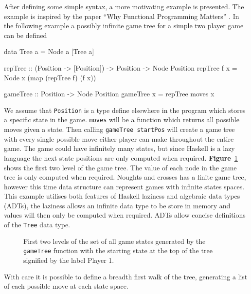 \documentclass[float=false, crop=false]{standalone}
\newcommand{\namefig}{\textbf{Figure}~}
\begin{document}
After defining some simple syntax, a more motivating example is presented. The example is 
inspired by the paper ``Why Functional Programming Matters''
\cite[]{whyfpm}. 
In the following example a possibly infinite game tree for a simple
two player game can be defined 
\begin{HaskellLst}
data Tree a = Node a [Tree a]

repTree :: (Position -> [Position]) -> Position -> Node Position
repTree f x = Node x (map (repTree f) (f x))

gameTree :: Position -> Node Position
gameTree x = repTree moves x
\end{HaskellLst}
We assume that \verb|Position| is a type define elsewhere in the program 
which stores a specific state in the game. 
\verb|moves| will be a function which returns all possible moves given a state.
Then calling \verb|gameTree startPos| will create
a game tree with every single possible move either player can make throughout
the entire game. The game could have infinitely many states, but since
Haskell is a lazy language the next state positions are only computed
when required. \namefig\ref{figure:tictactoeTree} shows the first two level of the game tree.
The value of each node in the game tree is only computed when required. Noughts and
crosses has a finite game tree, however this time data structure can represent games 
with infinite states spaces. This example utilises both features
of Haskell laziness and algebraic data types (ADTs), the laziness allows an 
infinite data type to be store in memory and values will then only be computed when
required. ADTs allow concise definitions of the \verb|Tree| data type.
\begin{figure}
  \centering
{}
\caption[Noughts and crosses game states]{First two levels of the set of all game states generated by the 
  \texttt{gameTree} function with the starting state at the top of 
  the tree signified by the label \textcolor{pgrey}{\textsf{Player 1}}.}
\label{figure:tictactoeTree}
\end{figure}
With care it is possible to define a breadth first walk of the tree, generating 
a list of each possible move at each state space. 
\end{document}
